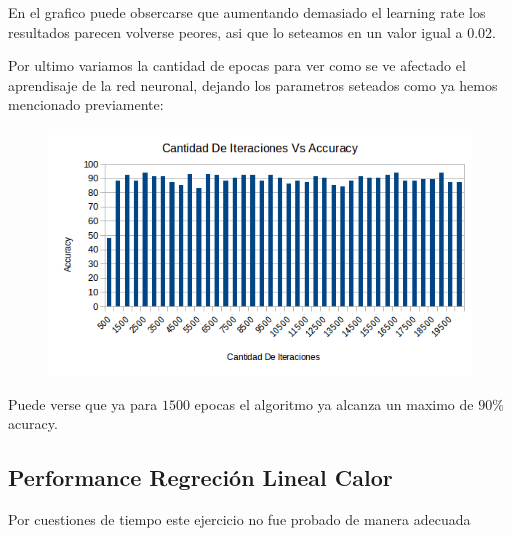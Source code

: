 En el grafico puede obsercarse que aumentando demasiado el learning rate los resultados parecen volverse peores, asi que lo seteamos en un valor igual a $0.02$.

Por ultimo variamos la cantidad de epocas para ver como se ve afectado el aprendisaje de la red neuronal, dejando los parametros seteados como ya hemos mencionado previamente:

\begin{figure}[h!]
  \centering
    \includegraphics[scale=0.4]{ej1/iteraciones Vs accuracy.png}
\end{figure}

Puede verse que ya para $1500$ epocas el algoritmo ya alcanza un maximo de $90\%$ acuracy.

\subsection{Performance Regreción Lineal Calor} 

Por cuestiones de tiempo este ejercicio no fue probado de manera adecuada